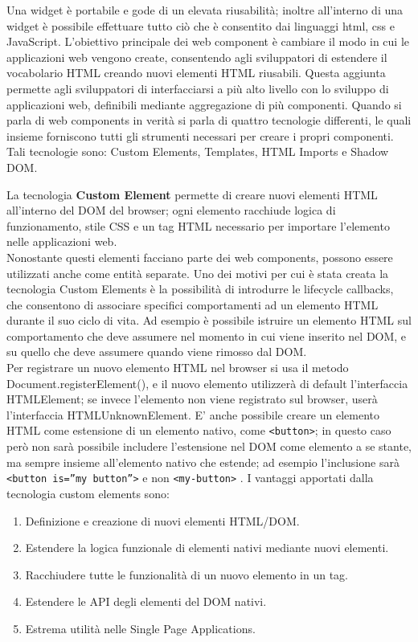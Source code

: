 Una widget è portabile e gode di un elevata riusabilità; inoltre all’interno di una widget è possibile effettuare tutto ciò che è consentito dai linguaggi html, css e JavaScript. 
L’obiettivo principale dei web component è cambiare il modo in cui le applicazioni web vengono create, consentendo agli sviluppatori di estendere il vocabolario HTML creando nuovi elementi HTML riusabili. Questa aggiunta permette agli sviluppatori di interfacciarsi a più alto livello con lo sviluppo di applicazioni web, definibili mediante aggregazione di più componenti.
Quando si parla di web components in verità si parla di quattro tecnologie differenti, le quali insieme forniscono tutti gli strumenti necessari per creare i propri componenti.
Tali tecnologie sono: Custom Elements, Templates, HTML Imports e Shadow DOM. 

La tecnologia \textbf{Custom Element} permette di creare nuovi elementi HTML all’interno del DOM del browser; ogni elemento racchiude logica di funzionamento, stile CSS e un tag HTML necessario per importare l’elemento nelle applicazioni web.
\\
Nonostante questi elementi facciano parte dei web components, possono essere utilizzati anche come entità separate. Uno dei motivi per cui è stata creata la tecnologia Custom Elements è la possibilità di introdurre le lifecycle callbacks, che consentono di associare specifici comportamenti ad un elemento HTML durante il suo ciclo di vita. Ad esempio è possibile istruire un elemento HTML sul comportamento che deve assumere nel momento in cui viene inserito nel DOM, e su quello che deve assumere quando viene rimosso dal DOM.
\\
Per registrare un nuovo elemento HTML nel browser si usa il metodo Document.registerElement(), e il nuovo elemento utilizzerà di default l’interfaccia HTMLElement; se invece l’elemento non viene registrato sul browser, userà l’interfaccia HTMLUnknownElement. E’ anche possibile creare un elemento HTML come estensione di un elemento nativo, come \texttt{<button>}; in questo caso però non sarà possibile includere l’estensione nel DOM come elemento a se stante, ma sempre insieme all’elemento nativo che estende; ad esempio l’inclusione sarà \texttt{<button is=”my button”>} e non \texttt{<my-button>} .
I vantaggi apportati dalla tecnologia custom elements sono:
\begin{enumerate}
\item Definizione e creazione di nuovi elementi HTML/DOM.
\item Estendere la logica funzionale di elementi nativi mediante nuovi elementi.
\item Racchiudere tutte le funzionalità di un nuovo elemento in un tag.
\item Estendere le API degli elementi del DOM nativi.
\item Estrema utilità nelle Single Page Applications.
\end{enumerate}
